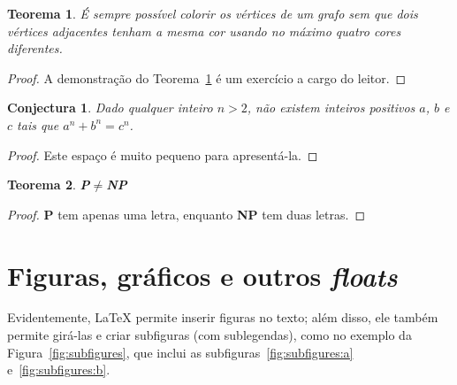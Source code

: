 \theoremstyle{plain} %
\newtheorem{theorem}{Teorema}

\begin{theorem}
  \label{thm:graphcolor}
  É sempre possível colorir os vértices de um grafo sem que dois vértices
  adjacentes tenham a mesma cor usando no máximo quatro cores diferentes.
\end{theorem}

\begin{proof}
  A demonstração do Teorema~\ref{thm:graphcolor} é um exercício
  a cargo do leitor.
  \renewcommand\qedsymbol{} %
\end{proof}

\theoremstyle{maybe} %
\newtheorem{conjecture}{Conjectura}

\begin{conjecture}
  \label{conj:fermat}
  Dado qualquer inteiro $n > 2$, não existem inteiros positivos
  $a$, $b$ e $c$ tais que $a^n + b^n = c^n$.
\end{conjecture}

\begin{proof}
  Este espaço é muito pequeno para apresentá-la.
  \renewcommand\qedsymbol{}
\end{proof}

\begin{theorem}
  \label{thm:pnp}
  \textup{\textsf{\textbf{P$\ne$NP}}}
\end{theorem}

\begin{proof}
  \textsf{\textbf{P}} tem apenas uma letra, enquanto
  \textsf{\textbf{NP}} tem duas letras.
\end{proof}

\section{Figuras, gráficos e outros \emph{floats}}

Evidentemente, \LaTeX{} permite inserir figuras no texto; além disso, ele
também permite girá-las e criar subfiguras (com sublegendas),
como no exemplo da Figura~\ref{fig:subfigures}, que inclui
as subfiguras~\ref{fig:subfigures:a} e~\ref{fig:subfigures:b}.


